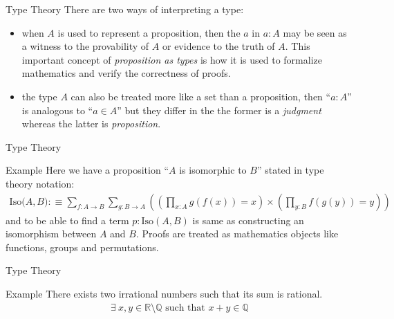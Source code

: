 \documentclass[10pt]{beamer}
\begin{document}
\begin{frame}{Type Theory}
There are two ways of interpreting a type:
\begin{itemize}
\item when $A$ is used to represent a proposition, then the $a$ in $a:A$ may be seen as a witness to the provability of $A$ or evidence to the truth of $A$. This important concept of \emph{proposition as types} is how it is used to formalize mathematics and verify the correctness of proofs.
\item the type $A$ can also be treated more like a set than a proposition, then ``$a : A$'' is analogous to ``$a \in A$'' but they differ in the the former is a \emph{judgment} whereas the latter is \emph{proposition}. 
\end{itemize}
\end{frame}

\begin{frame}{Type Theory}
\begin{exampleblock}{Example}
Here we have a proposition ``$A$ is isomorphic to $B$'' stated in type theory notation:
\begin{align*}
\text{Iso($A,B$)}:\equiv \sum_{f:A\to B}\sum_{g:B\to A}\left(\left(\prod_{x:A}g(f(x))=x\right)\times \left(\prod_{y:B}f(g(y))=y\right)\right)
\end{align*}
and to be able to find a term $p:\text{Iso}(A,B)$ is same as constructing an isomorphism between $A$ and $B$. Proofs are treated as mathematics objects like functions, groups and permutations.
\end{exampleblock}
\end{frame}

\begin{frame}{Type Theory}
\begin{exampleblock}{Example}
There exists two irrational numbers such that its sum is rational.
\begin{align*}
 \exists~ x, y \in \mathbb{R}\setminus\mathbb{Q} \text{  such that  } x + y \in \mathbb{Q}
\end{align*}
\end{exampleblock}
\end{frame}
\end{document}
